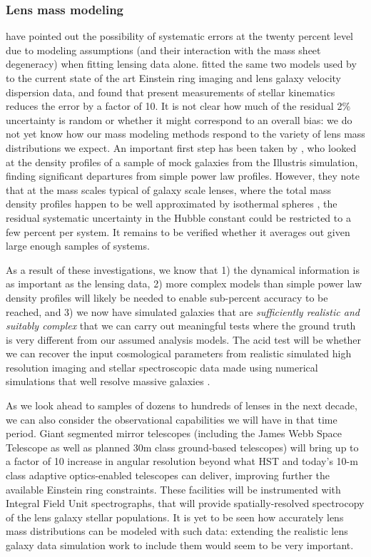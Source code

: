 \subsubsection{Lens mass modeling}

\citet{S+S13} have pointed out the possibility of systematic errors at
the twenty percent level due to modeling assumptions (and their
interaction with the mass sheet degeneracy) when fitting lensing data
alone.
\citet{Suy++14} fitted the same two models used by
\citet{S+S13}  to the current state of the art Einstein ring imaging and
lens galaxy velocity dispersion data, and found that present
measurements of stellar kinematics reduces the error by a factor of
10.  It is not clear how much of the residual 2\% uncertainty is
random or whether it might correspond to an overall bias: we do not
yet know how our mass modeling methods respond to the variety of lens
mass distributions we expect. An important first step has been taken
by \citet{XuEtal2016}, who looked at the density profiles of a sample
of mock galaxies from the Illustris simulation, finding significant
departures from simple power law profiles. However, they note that at
the mass scales typical of galaxy scale lenses, where the total mass
density profiles happen to be well approximated by isothermal spheres
\citep{Koo++09,Aug++10}, the residual systematic uncertainty
in the Hubble constant could be restricted to a few percent per
system. It remains to be verified whether it averages out given large
enough samples of systems.

As a result of these investigations, we know that 1) the dynamical
information is as important as the lensing data, 2) more complex
models than simple power law density profiles will likely be needed to
enable sub-percent accuracy to be reached, and 3) we now have
simulated galaxies that are {\it sufficiently realistic and suitably
complex} that we can carry out meaningful tests where the ground truth
is very different from our assumed analysis models. The acid test will
be whether we can recover the input cosmological parameters from
realistic simulated high resolution imaging and stellar spectroscopic
data made using numerical simulations that well resolve massive
galaxies \citep[e.g.,][]{Fia++16}.

As we look ahead to samples of dozens to hundreds of lenses in the
next decade, we can also consider the observational capabilities we
will have in that time period. Giant segmented mirror telescopes
(including the James Webb Space Telescope as well as planned 30m class
ground-based telescopes) will bring up to a factor of 10 increase in
angular resolution beyond what HST and today's 10-m class adaptive
optics-enabled telescopes can deliver, improving further the available
Einstein ring constraints. These facilities will be instrumented with
Integral Field Unit spectrographs, that will provide
spatially-resolved spectrocopy of the lens galaxy stellar populations.
It is yet to be seen how accurately lens mass distributions can be
modeled with such data: extending the realistic lens galaxy data
simulation work to include them would seem to be very important.

